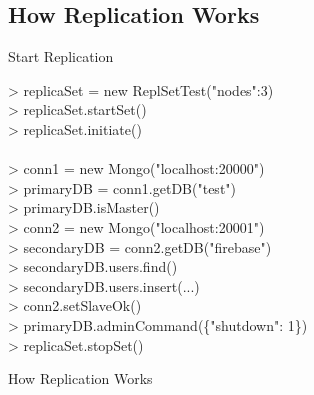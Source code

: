 \documentclass{beamer}
\begin{document}
\subsection{How Replication Works}
\begin{frame}{Start Replication}
\scriptsize
\begin{Alms*}
	> replicaSet = new ReplSetTest({"nodes":3}) \\
	> replicaSet.startSet() \\
	> replicaSet.initiate() \\
	\\
	> conn1 = new Mongo("localhost:20000") \\
	> primaryDB = conn1.getDB("test") \\
	> primaryDB.isMaster() \\
	> conn2 = new Mongo("localhost:20001") \\
	> secondaryDB = conn2.getDB("firebase") \\
	> secondaryDB.users.find() \\
	> secondaryDB.users.insert(...) \\
	> conn2.setSlaveOk() \\
	> primaryDB.adminCommand(\{"shutdown": 1\}) \\
	
	> replicaSet.stopSet() \\

\end{Alms*}

\end{frame}

\begin{frame}{How Replication Works}

\end{frame}
\end{document}
